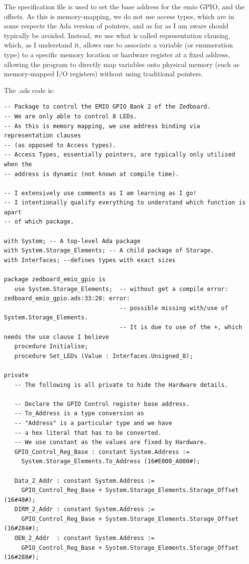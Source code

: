 The specification file is used to set the base address for the \gls{emio} GPIO, and the offsets. As this is memory-mapping, we do not use access types, which are in some respects the Ada version of pointers, and as far as I am aware should typically be avoided. Instead, we use what is called representation clausing, which, as I understand it, allows one to associate a variable (or enumeration type) to a specific memory location or hardware register at a fixed address, allowing the program to directly map variables onto physical memory (such as memory-mapped I/O registers) without using traditional pointers.

The .ads code is:

\begin{lstlisting}[style=ada]
    -- Package to control the EMIO GPIO Bank 2 of the Zedboard.
-- We are only able to control 8 LEDs.
-- As this is memory mapping, we use address binding via representation clauses
-- (as opposed to Access types).
-- Access Types, essentially pointers, are typically only utilised when the
-- address is dynamic (not known at compile time).

-- I extensively use comments as I am learning as I go!
-- I intentionally qualify everything to understand which function is apart
-- of which package.

with System; -- A top-level Ada package
with System.Storage_Elements; -- A child package of Storage.
with Interfaces; --defines types with exact sizes

package zedboard_emio_gpio is
   use System.Storage_Elements;  -- without get a compile error: zedboard_emio_gpio.ads:33:28: error: 
                                 -- possible missing with/use of System.Storage_Elements.
                                 -- It is due to use of the +, which needs the use clause I believe
   procedure Initialise;
   procedure Set_LEDs (Value : Interfaces.Unsigned_8);

private
   -- The following is all private to hide the Hardware details.

   -- Declare the GPIO Control register base address.
   -- To_Address is a type conversion as
   -- "Address" is a particular type and we have
   -- a hex literal that has to be converted.
   -- We use constant as the values are fixed by Hardware.
   GPIO_Control_Reg_Base : constant System.Address :=
     System.Storage_Elements.To_Address (16#E000_A000#);

   Data_2_Addr : constant System.Address :=
     GPIO_Control_Reg_Base + System.Storage_Elements.Storage_Offset (16#48#);
   DIRM_2_Addr : constant System.Address :=
     GPIO_Control_Reg_Base + System.Storage_Elements.Storage_Offset (16#284#);
   OEN_2_Addr  : constant System.Address :=
     GPIO_Control_Reg_Base + System.Storage_Elements.Storage_Offset (16#288#);


\end{lstlisting}
